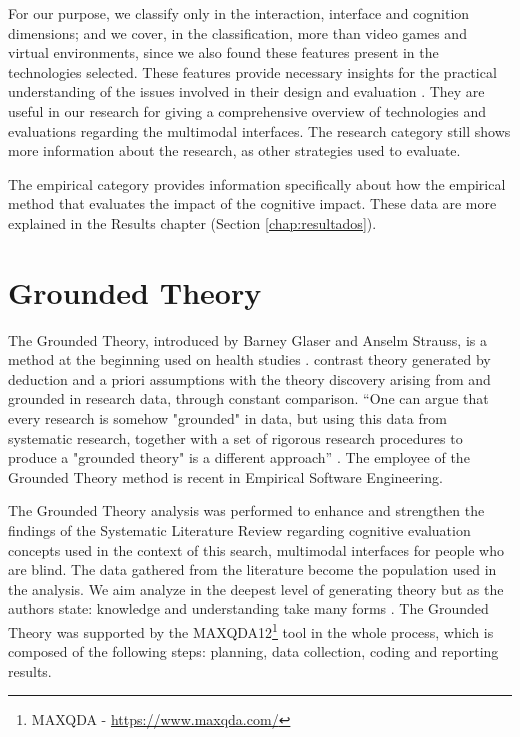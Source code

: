 For our purpose, we classify only in the interaction, interface and cognition dimensions; and we cover, in the classification, more than video games and virtual environments, since we also found these features present in the technologies selected. These features provide necessary insights for the practical understanding of the issues involved in their design and evaluation \cite{Darin2015}. They are useful in our research for giving a comprehensive overview of technologies and evaluations regarding the multimodal interfaces. The research category still shows more information about the research, as other strategies used to evaluate.

The empirical category provides information specifically about how the empirical method that evaluates the impact of the cognitive impact. These data are more explained in the Results chapter (Section \ref{chap:resultados}).

\section{Grounded Theory}
\label{sec:methodology-gt}

The Grounded Theory, introduced by Barney Glaser and Anselm Strauss, is a method at the beginning used on health studies \cite{Glaser1967}.  contrast theory generated by deduction and a priori assumptions with the theory discovery arising from and grounded in research data, through constant comparison. ``One can argue that every research is somehow "grounded" in data, but using this data from systematic research, together with a set of rigorous research procedures to produce a "grounded theory" is a different approach'' \cite{Motta2016}. The employee of the Grounded Theory method is recent in Empirical Software Engineering. 

The Grounded Theory analysis was performed to enhance and strengthen the findings of the Systematic Literature Review regarding cognitive evaluation concepts used in the context of this search, multimodal interfaces for people who are blind. The data gathered from the literature become the population used in the analysis. We aim analyze in the deepest level of generating theory but as the authors state: knowledge and understanding take many forms \cite{Corbin1998}. The Grounded Theory was supported by the MAXQDA12\footnote{MAXQDA - \url{https://www.maxqda.com/}} tool in the whole process, which is composed of the following steps: planning, data collection, coding and reporting results.

